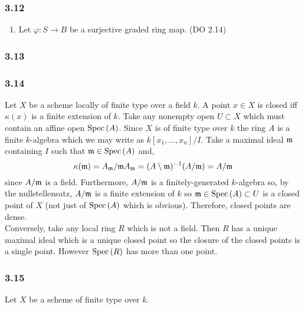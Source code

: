 \documentclass[12pt]{article}
\begin{document}
\subsubsection{3.12}

\begin{enumerate}
\item Let $\varphi : S \to B$ be a surjective graded ring map. (DO 2.14)
\end{enumerate}

\subsubsection{3.13}

\subsubsection{3.14}

Let $X$ be a scheme locally of finite type over a field $k$. A point $x \in X$ is closed iff $\kappa(x)$ is a finite extension of $k$. Take any nonempty open $U \subset X$ which must contain an affine open $\mathrm{Spec}\left( A \right)$. Since $X$ is of finite type over $k$ the ring $A$ is a finite $k$-algebra which we may write as $k[x_1, \dots, x_n]/I$. Take a maximal ideal $\mathfrak{m}$ containing $I$ such that $\mathfrak{m} \in \mathrm{Spec}\left( A \right)$ and,
\[ \kappa(\mathfrak{m}) = A_{\mathfrak{m}} / \mathfrak{m} A_{\mathfrak{m}} = (A \setminus \mathfrak{m})^{-1} (A / \mathfrak{m}) = A / \mathfrak{m} \]
since $A / \mathfrak{m}$ is a field. Furthermore, $A / \mathfrak{m}$ is a finitely-generated $k$-algebra so, by the nullstellensatz, $A / \mathfrak{m}$ is a finite extension of $k$ so $\mathfrak{m} \in \mathrm{Spec}\left( A \right) \subset U$ is a closed point of $X$ (not just of $\mathrm{Spec}\left( A \right)$ which is obvious). Therefore, closed points are dense. 
\bigskip\\
Conversely, take any local ring $R$ which is not a field. Then $R$ has a unique maximal ideal which is a unique closed point so the closure of the closed points is a single point. However $\mathrm{Spec}\left( R \right)$ has more than one point.  

\subsubsection{3.15}

Let $X$ be a scheme of finite type over $k$.
\end{document}
